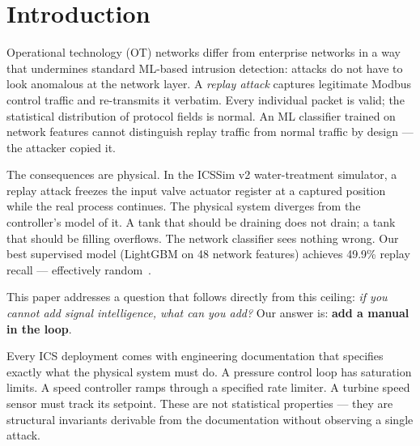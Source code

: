 \documentclass[sigconf,anonymous,review]{acmart}
\begin{document}


\maketitle

\section{Introduction}
\label{sec:intro}

Operational technology (OT) networks differ from enterprise networks in a way
that undermines standard ML-based intrusion detection: attacks do not have to
look anomalous at the network layer.  A \emph{replay attack} captures
legitimate Modbus control traffic and re-transmits it verbatim.  Every
individual packet is valid; the statistical distribution of protocol fields
is normal.  An ML classifier trained on network features cannot distinguish
replay traffic from normal traffic by design — the attacker copied it.

The consequences are physical.  In the ICSSim v2 water-treatment simulator,
a replay attack freezes the input valve actuator register at a captured
position while the real process continues.  The physical system diverges from
the controller's model of it.  A tank that should be draining does not drain;
a tank that should be filling overflows.  The network classifier sees nothing
wrong.  Our best supervised model (LightGBM on 48 network features) achieves
49.9\% replay recall — effectively random~\cite{ICSSim2022}.

This paper addresses a question that follows directly from this ceiling:
\emph{if you cannot add signal intelligence, what can you add?}  Our answer
is: \textbf{add a manual in the loop}.

Every ICS deployment comes with engineering documentation that specifies
exactly what the physical system must do.  A pressure control loop has
saturation limits.  A speed controller ramps through a specified rate limiter.
A turbine speed sensor must track its setpoint.  These are not statistical
properties — they are structural invariants derivable from the documentation
without observing a single attack.
\end{document}
